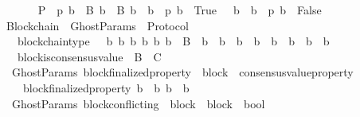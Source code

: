 \begin{isabellebody}
\ \ \isanewline
\ \ \ \ {\isachardoublequoteopen}P\ {\isasymequiv}\ {\isacharbraceleft}p{\isachardot}\ {\isasymexists}{\isacharbang}b\ {\isasymin}\ B{\isachardot}\ {\isasymforall}b{\isacharprime}\ {\isasymin}\ B{\isachardot}\ {\isacharparenleft}b\ {\isasymdownharpoonright}\ b{\isacharprime}\ {\isasymlongrightarrow}\ p\ b{\isacharprime}\ {\isacharequal}\ True{\isacharparenright}\ {\isasymand}\ {\isasymnot}\ {\isacharparenleft}b\ {\isasymdownharpoonright}\ b{\isacharprime}\ {\isasymlongrightarrow}\ p\ b{\isacharprime}\ {\isacharequal}\ False{\isacharparenright}{\isacharbraceright}{\isachardoublequoteclose}\isanewline
\isanewline
\isanewline
{}\isamarkupfalse%
\ Blockchain\ {\isacharequal}\ GhostParams\ {\isacharplus}\ Protocol\ {\isacharplus}\isanewline
\ \ \ blockchain{\isacharunderscore}type\ {\isacharcolon}\ {\isachardoublequoteopen}{\isasymforall}\ b\ b{\isacharprime}\ b{\isacharprime}{\isacharprime}{\isachardot}\ {\isacharbraceleft}b{\isacharcomma}\ b{\isacharprime}{\isacharcomma}\ b{\isacharprime}{\isacharprime}{\isacharbraceright}\ {\isasymsubseteq}\ B\ {\isasymlongrightarrow}\ b{\isacharprime}\ {\isasymdownharpoonright}\ b\ {\isasymand}\ b{\isacharprime}{\isacharprime}\ {\isasymdownharpoonright}\ b\ {\isasymlongrightarrow}\ {\isacharparenleft}b{\isacharprime}\ {\isasymdownharpoonright}\ b{\isacharprime}{\isacharprime}\ {\isasymor}\ b{\isacharprime}{\isacharprime}\ {\isasymdownharpoonright}\ b{\isacharprime}{\isacharparenright}{\isachardoublequoteclose}\isanewline
\ \ \ block{\isacharunderscore}is{\isacharunderscore}consensus{\isacharunderscore}value\ {\isacharcolon}\ {\isachardoublequoteopen}B\ {\isacharequal}\ C{\isachardoublequoteclose}\isanewline
\isanewline
{}\isamarkupfalse%
\ {\isacharparenleft}\ GhostParams{\isacharparenright}\ block{\isacharunderscore}finalized{\isacharunderscore}property\ {\isacharcolon}{\isacharcolon}\ {\isachardoublequoteopen}block\ {\isasymRightarrow}\ consensus{\isacharunderscore}value{\isacharunderscore}property{\isachardoublequoteclose}\isanewline
\ \ \isanewline
\ \ \ \ {\isachardoublequoteopen}block{\isacharunderscore}finalized{\isacharunderscore}property\ b\ {\isacharequal}\ {\isacharparenleft}{\isasymlambda}b{\isacharprime}{\isachardot}\ b\ {\isasymdownharpoonright}\ b{\isacharprime}{\isacharparenright}{\isachardoublequoteclose}\isanewline
\isanewline
{}\isamarkupfalse%
\ {\isacharparenleft}\ GhostParams{\isacharparenright}\ block{\isacharunderscore}conflicting\ {\isacharcolon}{\isacharcolon}\ {\isachardoublequoteopen}{\isacharparenleft}block\ {\isacharasterisk}\ block{\isacharparenright}\ {\isasymRightarrow}\ bool{\isachardoublequoteclose}\isanewline

\end{isabellebody}
